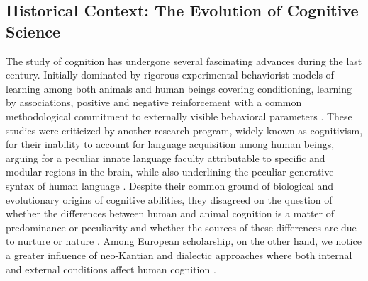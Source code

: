 \subsection{Historical Context: The Evolution of Cognitive Science}
The study of cognition has undergone several fascinating advances during the last century. Initially dominated by rigorous experimental behaviorist models of learning among both animals and human beings covering conditioning, learning by associations, positive and negative reinforcement with a common methodological commitment to externally visible behavioral parameters \citep{pavlov1927, skinner1938, skinner1953science, thorndike1898, watson1913psychology}. These studies were criticized by another research program, widely known as cognitivism, for their inability to account for language acquisition among human beings, arguing for a peculiar innate language faculty attributable to specific and modular regions in the brain, while also underlining the peculiar generative syntax of human language \citep{chomsky1965aspects, chomsky1986knowledge, fodor1975language, fodor_modularity_1983, pinker1994language, pinker1997mind}. Despite their common ground of biological and evolutionary origins of cognitive abilities, they disagreed on the question of whether the differences between human and animal cognition is a matter of predominance or peculiarity and whether the sources of these differences are due to nurture or nature \citep{chomsky1975reflections, pinker2002blankslate, watson1924behaviorism, skinner1971beyond}. Among European scholarship, on the other hand, we notice a greater influence of neo-Kantian and dialectic approaches where both internal and external conditions affect human cognition \citep{piaget-biology-knowledge, piaget1970genetic, ponty1969phenomenology, Merleau-Ponty2013-vs, Vygotsky1978-bk}.

